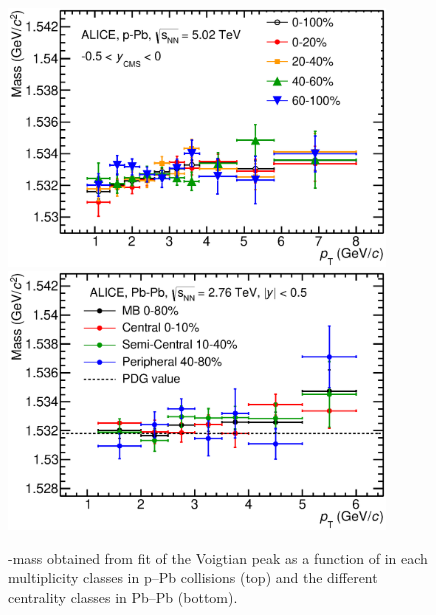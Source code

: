\begin{figure}[htbp]
\begin{center}
\includegraphics[width=10.0cm]{./Version1/FigChapter5/Extraction/pPbMass.eps}
\hspace{0.5cm}
\includegraphics[width=10.0cm]{./Version1/FigChapter5/Extraction/PbPbMass.eps}
\caption{\xis-mass obtained from fit of the Voigtian peak as a function of \pt in each multiplicity classes in p--Pb collisions (top) and the different centrality classes in Pb--Pb (bottom).} 
 \label{fig:mass}
\end{center}
\end{figure}


